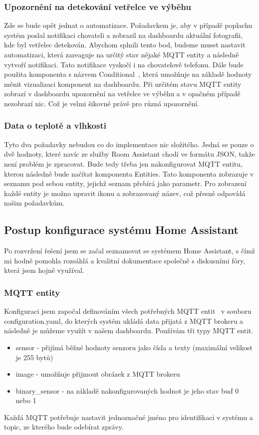 \subsubsection*{Upozornění na detekování vetřelce ve výběhu}
Zde se bude opět jednat o automatizace.
Požadavkem je, aby v případě poplachu systém poslal notifikaci chovateli a zobrazil na dashboardu aktuální fotografii, kde byl vetřelec detekován.\newline
Abychom splnili tento bod, budeme muset nastavit automatizaci, která zareaguje na určitý stav nějaké MQTT entity a následně vytvoří notifikaci.
Tato notifikace vyskočí i na chovatelově telefonu.
Dále bude použita komponenta s názvem Conditional~\cite{HomeAssistantConditionalCard}, která umožňuje na základě hodnoty měnit vizualizaci komponent na dashboardu.
Při určitém stavu MQTT entity zobrazí v dashboardu upozornění na vetřelce ve výběhu a v opačném případě nezobrazí nic.
Což je velmi šikovné právě pro různá upozornění.

\subsubsection*{Data o teplotě a vlhkosti}
Tyto dva požadavky nebudou co do implementace nic složitého.
Jedná se pouze o dvě hodnoty, které navíc ze služby Room Assistant chodí ve formátu JSON, takže není problém je zpracovat.\newline
Bude tedy třeba jen nakonfigurovat MQTT entitu, kterou následně bude načítat komponenta Entities.
Tato komponenta zobrazuje v seznamu pod sebou entity, jejichž seznam přebírá jako parametr.
Pro zobrazení každé entity je možno upravit ikonu a zobrazovaný název, což přesně odpovídá našim požadavkům.

\subsection{Postup konfigurace systému Home Assistant}
Po rozvržení řešení jsem se začal seznamovat se systémem Home Assistant, s čímž mi hodně pomohla rozsáhlá a kvalitní dokumentace společně s diskusními fóry, která jsem hojně využíval.
\subsubsection*{MQTT entity}
Konfiguraci jsem započal definováním všech potřebných MQTT entit~\cite{HomeAssistantMQTT, HomeAssistantEntities} v souboru configuration.yaml, do kterých systém ukládá data přijatá z MQTT brokeru a následně je můžeme využít v našem dashboardu.
Používám tři typy MQTT entit.
\begin{itemize}
    \item sensor - přijímá běžné hodnoty senzoru jako čísla a texty (maximální velikost je 255 bytů)
    \item image - umožňuje přijmout obrázek z MQTT brokeru
    \item binary\_sensor - na základě nakonfigurovaných hodnot je jeho stav buď 0 nebo 1
\end{itemize}
Každá MQTT potřebuje nastavit jednoznačné jméno pro identifikaci v systému a topic, ze kterého bude odebírat zprávy.


